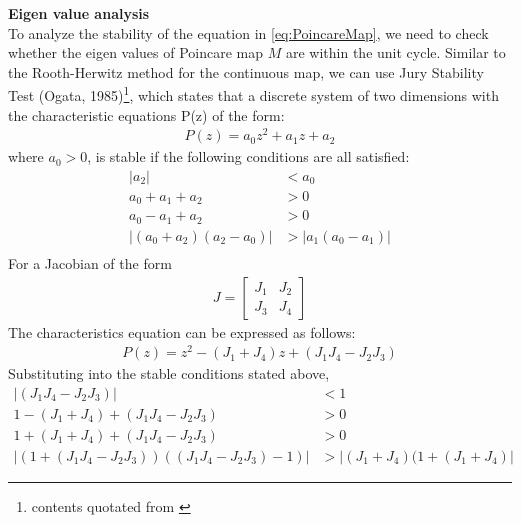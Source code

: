 \pagebreak
\noindent \textbf{Eigen value analysis}\\
To analyze the stability of the equation in \ref{eq:PoincareMap}, we need to check whether the eigen values of Poincare map $M$ are within the unit cycle. Similar to the Rooth-Herwitz method for the continuous map, we can use Jury Stability Test (Ogata, 1985)\footnote{contents quotated from \cite{Cham2002}}, which states that a discrete system of two dimensions with the characteristic equations P(z) of the form:
\begin{align*}
P(z) = a_0z^2 + a_1z + a_2
\end{align*}
where $a_0>0$, is stable if the following conditions are all satisfied:
\begin{align*}
|a_2|&<a_0\\
a_0+a_1+a_2&>0\\
a_0-a_1+a_2&>0\\
|(a_0+a_2)(a_2-a_0)|&>|a_1(a_0-a_1)|\\
\end{align*}
For a Jacobian of the form 
\begin{align*}
J = \begin{bmatrix}
J_1 & J_2 \\
J_3 & J_4
\end{bmatrix}
\end{align*}
The characteristics equation can be expressed as follows:
\begin{align*}
P(z) = z^2-(J_1+J_4)z +(J_1J_4-J_2J_3)
\end{align*}
Substituting into the stable conditions stated above,
\begin{align}
\label{eq:condition1}
|(J_1J_4-J_2J_3)|&<1\\
\label{eq:condition2}
1-(J_1+J_4)+(J_1J_4-J_2J_3)&>0\\
\label{eq:condition3}
1+(J_1+J_4)+(J_1J_4-J_2J_3)&>0\\
\label{eq:condition4}
|(1+(J_1J_4-J_2J_3))((J_1J_4-J_2J_3)-1)|&>|(J_1+J_4)(1+(J_1+J_4)|
\end{align}

